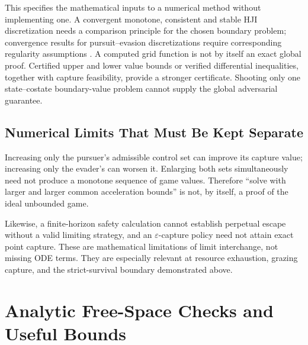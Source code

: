 \documentclass[journal,a4paper]{IEEEtran}
\begin{document}
This specifies the mathematical inputs to a numerical method without implementing one. A convergent monotone, consistent and stable HJI discretization needs a comparison principle for the chosen boundary problem; convergence results for pursuit--evasion discretizations require corresponding regularity assumptions \cite{Soravia1998}. A computed grid function is not by itself an exact global proof. Certified upper and lower value bounds or verified differential inequalities, together with capture feasibility, provide a stronger certificate. Shooting only one state--costate boundary-value problem cannot supply the global adversarial guarantee.

\subsection{Numerical Limits That Must Be Kept Separate}
Increasing only the pursuer's admissible control set can improve its capture value; increasing only the evader's can worsen it. Enlarging both sets simultaneously need not produce a monotone sequence of game values. Therefore ``solve with larger and larger common acceleration bounds'' is not, by itself, a proof of the ideal unbounded game.

Likewise, a finite-horizon safety calculation cannot establish perpetual escape without a valid limiting strategy, and an $\varepsilon$-capture policy need not attain exact point capture. These are mathematical limitations of limit interchange, not missing ODE terms. They are especially relevant at resource exhaustion, grazing capture, and the strict-survival boundary demonstrated above.

\section{Analytic Free-Space Checks and Useful Bounds}
\label{sec:benchmarks}
\end{document}
